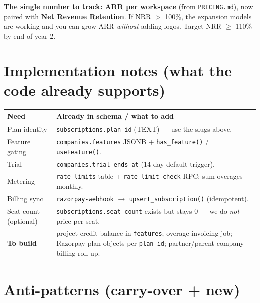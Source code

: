 \documentclass[11pt,a4paper]{article}
\begin{document}
\begin{keybox}
\textbf{The single number to track: ARR per workspace} (from \texttt{PRICING.md}),
now paired with \textbf{Net Revenue Retention}. If NRR $>$ 100\%, the expansion
models are working and you can grow ARR \emph{without} adding logos. Target NRR
$\geq$ 110\% by end of year 2.
\end{keybox}

\section{Implementation notes (what the code already supports)}

\begin{center}
\begin{tabular}{@{}L{5.0cm} L{9.5cm}@{}}
  \toprule
  \textbf{Need} & \textbf{Already in schema / what to add} \\
  \midrule
  Plan identity        & \texttt{subscriptions.plan\_id} (TEXT) --- use the slugs above. \\
  Feature gating       & \texttt{companies.features} JSONB + \texttt{has\_feature()} / \texttt{useFeature()}. \\
  Trial                & \texttt{companies.trial\_ends\_at} (14-day default trigger). \\
  Metering             & \texttt{rate\_limits} table + \texttt{rate\_limit\_check} RPC; sum overages monthly. \\
  Billing sync         & \texttt{razorpay-webhook} $\rightarrow$ \texttt{upsert\_subscription()} (idempotent). \\
  Seat count (optional)& \texttt{subscriptions.seat\_count} exists but stays 0 --- we do \emph{not} price per seat. \\
  \midrule
  \textbf{To build}    & project-credit balance in \texttt{features}; overage invoicing job; Razorpay plan objects per \texttt{plan\_id}; partner/parent-company billing roll-up. \\
  \bottomrule
\end{tabular}
\end{center}

\section{Anti-patterns (carry-over + new)}
\end{document}
